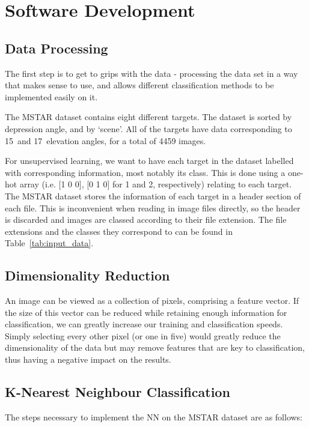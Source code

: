 \chapter{Software Development}\label{sec:method}

\section{Data Processing}
The first step is to get to grips with the data - processing the data set in a way that makes sense to use, and allows different classification methods to be implemented easily on it.

The MSTAR dataset contains eight different targets. The dataset is sorted by depression angle, and by `scene'. All of the targets have data corresponding to  15\degree~and 17\degree~elevation angles, for a total of 4459 images.

For unsupervised learning, we want to have each target in the dataset labelled with corresponding information, most notably its class. This is done using a one-hot array (i.e. [1 0 0], [0 1 0] for 1 and 2, respectively) relating to each target. The MSTAR dataset stores the information of each target in a header section of each file. This is inconvenient when reading in image files directly, so the header is discarded and images are classed according to their file extension. The file extensions and the classes they correspond to can be found in Table~\ref{tab:input_data}.


\section{Dimensionality Reduction}
An image can be viewed as a collection of pixels, comprising a feature vector. If the size of this vector can be reduced while retaining enough information for classification, we can greatly increase our training and classification speeds. Simply selecting every other pixel (or one in five) would greatly reduce the dimensionality of the data but may remove features that are key to classification, thus having a negative impact on the results.


\section{K-Nearest Neighbour Classification}
The steps necessary to implement the NN on the MSTAR dataset are as follows:\\

